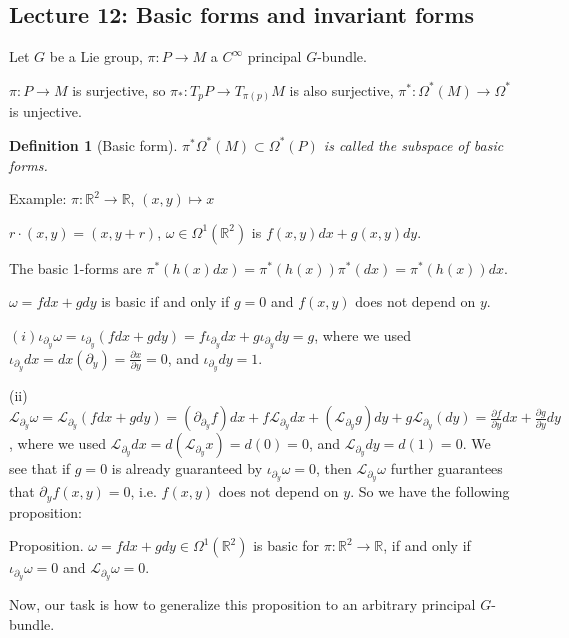 \documentclass{article}
\theoremstyle{mystyle}
\newtheorem*{definition}{Definition}%
\theoremstyle{remark}
\numberwithin{equation}{section}
\begin{document}
\subsection{Lecture 12: Basic forms and invariant forms}

Let $G$ be a Lie group, $\pi\colon P\rightarrow M$ a $C^\infty$ principal $G$-bundle. 

$\pi\colon P\rightarrow M$ is surjective, so $\pi_*\colon T_pP\rightarrow T_{\pi(p)}M$ is also surjective, $\pi^*\colon \Omega^*(M)\rightarrow \Omega^*$ is unjective. 

\begin{definition}[Basic form]
$\pi^*\Omega^*(M)\subset \Omega^*(P)$ is called the subspace of \emph{basic forms.}
\end{definition}

Example: $\pi\colon \mathbb{R}^2\rightarrow \mathbb{R}$, $(x,y)\mapsto x$

$r\cdot (x,y) = (x,y+r)$, $\omega \in \Omega^1(\mathbb{R}^2)$ is $f(x,y)dx+g(x,y)dy$. 

The basic 1-forms are $\pi^*(h(x)dx) = \pi^*(h(x)) \pi^*(dx) = \pi^*(h(x)) dx$.

$\omega = fdx+gdy$ is basic if and only if $g=0$ and $f(x,y)$ does not depend on $y$. 

$(i) \iota_{\partial_y} \omega = \iota_{\partial_y} (fdx + gdy)
=f \iota_{\partial_y} dx + g\iota_{\partial_y} dy =  g$, where we used $\iota_{\partial_y} dx = dx(\partial_y) = \frac{\partial x}{\partial y}=0$, and $\iota_{\partial_y} dy = 1$.  

(ii) $\mathcal{L}_{\partial_y}\omega = \mathcal{L}_{\partial_y}(fdx+gdy) = (\partial_{\partial_y}f)dx + f\mathcal{L}_{\partial_y} dx + (\mathcal{L}_{\partial_y} g)dy + g \mathcal{L}_{\partial_y} (dy) = \frac{\partial f}{\partial y} dx + \frac{\partial g}{\partial y}dy$, where we used $\mathcal{L}_{\partial_y} dx = d( \mathcal{L}_{\partial_y} x) = d (0) = 0$, and $\mathcal{L}_{\partial_y} dy = d(1) = 0$.  We see that if $g=0$ is already guaranteed by $\iota_{\partial_y} \omega=0$, then $\mathcal{L}_{\partial_y}\omega$ further guarantees that $\partial_y f(x,y)=0$, i.e. $f(x,y)$ does not depend on $y$. So we have the following proposition:

Proposition. $\omega = f dx + gdy \in \Omega^1(\mathbb{R}^2)$ is basic for $\pi\colon \mathbb{R}^2\rightarrow \mathbb{R}$, if and only if $\iota_{\partial_y} \omega = 0 $ and $\mathcal{L}_{\partial_y} \omega = 0$.

Now, our task is how to generalize this proposition to an arbitrary principal $G$-bundle.
\end{document}
